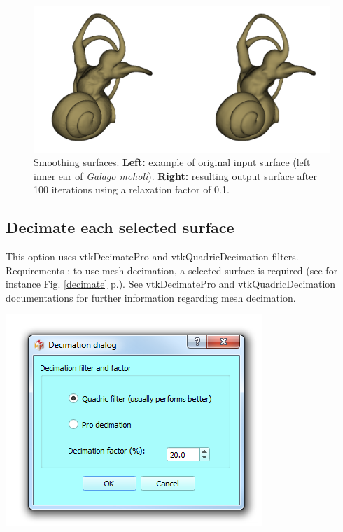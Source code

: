 \begin{figure}
  \centering
  \includegraphics[scale=0.35]{images/09/structure/surface_smoothing_example.png} 
	\caption{Smoothing surfaces. \textbf{Left:} example of original input surface (left inner ear of \textit{Galago moholi}). \textbf{Right:} resulting output surface after 100 iterations using a relaxation factor of 0.1.}
\label{smooth}
 
\end{figure}





\subsection{Decimate each selected surface}
\noindent
\begin{minipage}{0.5\textwidth}


This option uses vtkDecimatePro and vtkQuadricDecimation filters. Requirements : to use mesh decimation, a selected
surface is required (see for instance Fig. \ref{decimate} p.\pageref{decimate}). See vtkDecimatePro and vtkQuadricDecimation documentations for further information regarding
mesh decimation.

\end{minipage}    
\begin{minipage}{0.5\textwidth}\centering
  \includegraphics[scale=0.5]{images/09/structure/decimation_dialog.png}
 \end{minipage} 
\noindent

